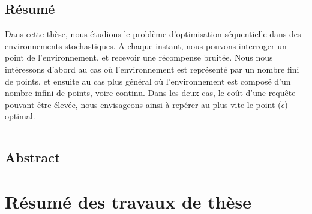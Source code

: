 \section*{\centering R\'esum\'e}

Dans cette th\`ese, nous \'etudions le probl\`eme d'optimisation s\'equentielle dans des enviro\-nnements stochastiques. A chaque instant, nous pouvons interroger un point de l'enviro\-nnement, et recevoir une récompense bruit\'ee. Nous nous int\'eressons d'abord au cas o\`u l'environnement est représenté par un nombre fini de points, et ensuite au cas plus g\'en\'eral o\`u l'environnement est composé d'un nombre infini de points, voire continu. Dans les deux cas, le co\^ut d'une requ\^ete pouvant \^etre \'elev\'ee, nous envisageons ainsi \`a rep\'erer au plus vite le point ($\epsilon$)-optimal.

\begin{center}
    \rule{8cm}{0.4pt}
\end{center}

\section*{\centering Abstract}


\chapter*{R\'esum\'e des travaux de thèse}
